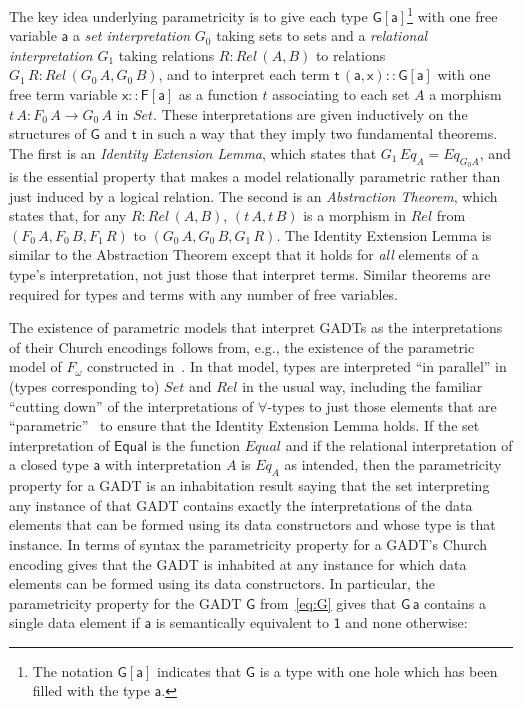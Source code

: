 \documentclass[submission,copyright,creativecommons]{eptcs}
\begin{document}
The key idea underlying parametricity is to give each type
$\mathsf{G[a]}$\footnote{The notation $\mathsf{G[a]}$ indicates that
  $\mathsf{G}$ is a type with one hole which has been filled with the
  type $\mathsf{a}$.}  with one free variable $\mathsf{a}$ a {\em set
  interpretation} $G_0$ taking sets to sets and a \emph{relational
  interpretation} $G_1$ taking relations $R : \mathit{Rel}\,(A,B)$ to
relations $G_1 \,R : \mathit{Rel}\,(G_0 \,A, G_0 \,B)$, and to
interpret each term $\mathsf{t\,(a,x) :: G[a]}$ with one free term
variable $\mathsf{x :: F[a]}$ as a function $t$ associating to each
set $A$ a morphism $t \,A : F_0\,A \to G_0\,A$ in $\mathit{Set}$.
These interpretations are given inductively on the structures of
$\mathsf{G}$ and $\mathsf{t}$ in such a way that they imply two
fundamental theorems. The first is an \emph{Identity Extension Lemma},
which states that $G_1\,\mathit{Eq}_A = \mathit{Eq}_{G_0 A}$, and is
the essential property that makes a model relationally parametric
rather than just induced by a logical relation.  The second is an
\emph{Abstraction Theorem}, which states that, for any $R
:\mathit{Rel}\,(A, B)$, $(t\, A, t\,B)$ is a morphism in
$\mathit{Rel}$ from $(F_0\,A,F_0\,B,F_1\,R)$ to
$(G_0\,A,G_0\,B,G_1\,R)$. The Identity Extension Lemma is similar to
the Abstraction Theorem except that it holds for {\em all} elements of
a type's interpretation, not just those that interpret terms.  Similar
theorems are required for types and terms with any number of free
variables.

The existence of parametric models that interpret GADTs as the
interpretations of their Church encodings follows from, e.g., the
existence of the parametric model of $F_\omega$ constructed
in~\cite{atk12}.  In that model, types are interpreted ``in parallel''
in (types corresponding to) $\mathit{Set}$ and $\mathit{Rel}$ in the
usual way, including the familiar ``cutting down'' of the
interpretations of $\forall$-types to just those elements that are
``parametric''~\cite{rey83,wad89} to ensure that the Identity
Extension Lemma holds. If the set interpretation of $\mathsf{Equal}$
is the function $\mathit{Equal}$ and if the relational interpretation
of a closed type $\mathsf{a}$ with interpretation $A$ is
$\mathit{Eq_A}$ as intended, then the parametricity property for a
GADT is an inhabitation result saying that the set interpreting any
instance of that GADT contains exactly the interpretations of the data
elements that can be formed using its data constructors and whose type
is that instance. In terms of syntax the parametricity property for a
GADT's Church encoding gives that the GADT is inhabited at any
instance for which data elements can be formed using its data
constructors. In particular, the parametricity property for the GADT
$\mathsf{G}$ from~\eqref{eq:G} gives that $\mathsf{G\,a}$ contains a
single data element if $\mathsf{a}$ is semantically equivalent to
$\mathsf{1}$ and none otherwise:
\end{document}
